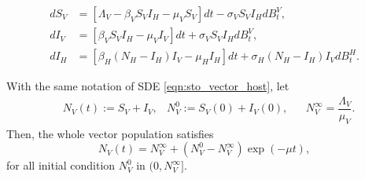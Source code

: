 \begin{equation} \label{eqn:sto_vector_host}
    \begin{aligned}
        d S_V &= 
            \left [
                \Lambda_V - \beta_V S_V I_H - \mu_V S_V 
            \right ] dt
            - \sigma_V S_V I_H dB_t^V,
            \\
        d I_V &= 
            \left [
               \beta_V S_V I_H - \mu_V I_V 
            \right ]
            dt 
            + \sigma_V S_V I_H dB_t^V,
            \\
        d I_H &= 
            \left [
                \beta_H (N_H - I_H) I_V - \mu_H I_H
            \right ] dt
            + \sigma_H (N_H - I_H) I_V d B^H_t .
   \end{aligned}
\end{equation}

\begin{lemma} \label{lem:exponential_growth}
    With the same notation of SDE \eqref{eqn:sto_vector_host},
    let 
    \begin{equation*}
        \begin{aligned}
            & N_V(t):= S_V + I_V,
            & N_V^0 := S_V(0) + I_V(0),
            &&  N_V^{\infty}= \dfrac{\Lambda_V}{\mu_V}.
        \end{aligned}
    \end{equation*}
    Then, the whole vector population satisfies
    $$
        N_V(t) = 
            N_V ^ \infty
            +
            \left(
                N_V ^ 0 - N_V ^ \infty
            \right)
            \exp(-\mu t),
    $$
    for all initial condition $N_V ^ 0 $ in $(0, N_V ^ \infty]$.
\end{lemma}
